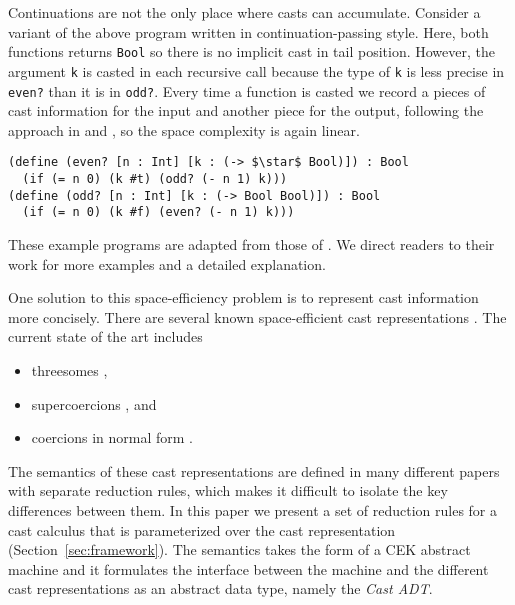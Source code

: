 \documentclass[runningheads]{llncs}
\begin{document}
Continuations are not the only place where casts can accumulate.
Consider a variant of the above program written in
continuation-passing style.  Here, both functions returns
\lstinline|Bool| so there is no implicit cast in tail position.
However, the argument \lstinline|k| is casted in each
recursive call because the type of \lstinline|k| is less precise in
\lstinline|even?| than it is in \lstinline|odd?|. 
Every time a function is casted we record a pieces of
cast information for the input and another piece for
the output, following the approach in \cite{breazu1991inheritance}
and \cite{breazu1990computing},
so the space complexity is again linear.
\begin{lstlisting}
(define (even? [n : Int] [k : (-> $\star$ Bool)]) : Bool
  (if (= n 0) (k #t) (odd? (- n 1) k)))
(define (odd? [n : Int] [k : (-> Bool Bool)]) : Bool
  (if (= n 0) (k #f) (even? (- n 1) k)))
\end{lstlisting}
These example programs are adapted from those of \cite{herman2010space}.
We direct readers to their work for more examples and a detailed explanation.

One solution to this space-efficiency problem is to represent cast
information more concisely. There are several known space-efficient
cast representations
\citep{Siek:2015:BCT:2737924.2737968,Siek:2010:TWB:1706299.1706342,Garcia:2013:CTB:2500365.2500603,kuhlenschmidt2018efficient,siek2012interpretations,garcia2014deriving}.
The current state of the art includes
\begin{itemize}
	\item threesomes 
	\citep{Siek:2010:TWB:1706299.1706342,Garcia:2013:CTB:2500365.2500603},
	\item supercoercions \citep{Garcia:2013:CTB:2500365.2500603}, and
	\item coercions in normal form
	\citep{siek2012interpretations,Siek:2015:BCT:2737924.2737968}.
\end{itemize}

The semantics of these cast representations are defined in many
different papers with separate reduction rules, which makes it
difficult to isolate the key differences between them.  In this paper
we present a set of reduction rules for a cast calculus that
is parameterized over the cast representation
(Section~\ref{sec:framework}).
The semantics takes the form of a CEK
abstract machine and it formulates the interface between the machine
and the different cast representations as an abstract data type,
namely the \emph{Cast ADT}.
\end{document}
